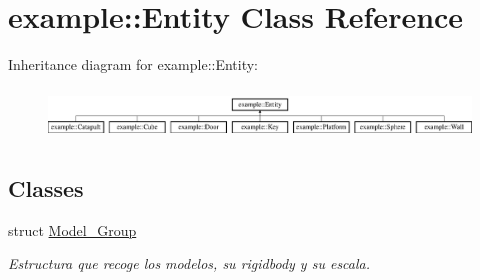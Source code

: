 \hypertarget{classexample_1_1_entity}{}\section{example\+::Entity Class Reference}
\label{classexample_1_1_entity}
Inheritance diagram for example\+::Entity\+:\begin{figure}[H]
\begin{center}
\leavevmode
\includegraphics[height=1.355932cm]{classexample_1_1_entity}
\end{center}
\end{figure}
\subsection*{Classes}
\begin{DoxyCompactItemize}
\item 
struct \mbox{\hyperlink{structexample_1_1_entity_1_1_model___group}{Model\+\_\+\+Group}}
\begin{DoxyCompactList}\small\item\em Estructura que recoge los modelos, su rigidbody y su escala. \end{DoxyCompactList}\end{DoxyCompactItemize}
